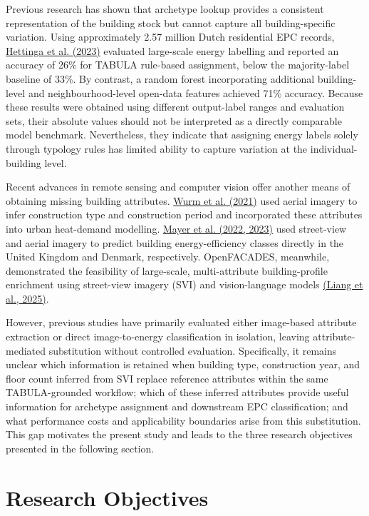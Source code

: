 Previous research has shown that archetype lookup provides a consistent representation of the building stock but cannot capture all building-specific variation. Using approximately 2.57 million Dutch residential EPC records, \hyperlink{ref:hettinga2023}{Hettinga et al. (2023)} evaluated large-scale energy labelling and reported an accuracy of 26\% for TABULA rule-based assignment, below the majority-label baseline of 33\%. By contrast, a random forest incorporating additional building-level and neighbourhood-level open-data features achieved 71\% accuracy. Because these results were obtained using different output-label ranges and evaluation sets, their absolute values should not be interpreted as a directly comparable model benchmark. Nevertheless, they indicate that assigning energy labels solely through typology rules has limited ability to capture variation at the individual-building level.


Recent advances in remote sensing and computer vision offer another means of obtaining missing building attributes. \hyperlink{ref:wurm2021}{Wurm et al. (2021)} used aerial imagery to infer construction type and construction period and incorporated these attributes into urban heat-demand modelling. \hyperlink{ref:mayer2023uk}{Mayer et al. (2022, 2023)} used street-view and aerial imagery to predict building energy-efficiency classes directly in the United Kingdom and Denmark, respectively. OpenFACADES, meanwhile, demonstrated the feasibility of large-scale, multi-attribute building-profile enrichment using street-view imagery (SVI) and vision-language models \hyperlink{ref:liang2025}{(Liang et al., 2025)}.


However, previous studies have primarily evaluated either image-based attribute extraction or direct image-to-energy classification in isolation, leaving attribute-mediated substitution without controlled evaluation. Specifically, it remains unclear which information is retained when building type, construction year, and floor count inferred from SVI replace reference attributes within the same TABULA-grounded workflow; which of these inferred attributes provide useful information for archetype assignment and downstream EPC classification; and what performance costs and applicability boundaries arise from this substitution. This gap motivates the present study and leads to the three research objectives presented in the following section.


\section{Research Objectives}
\label{sec:1_2}


